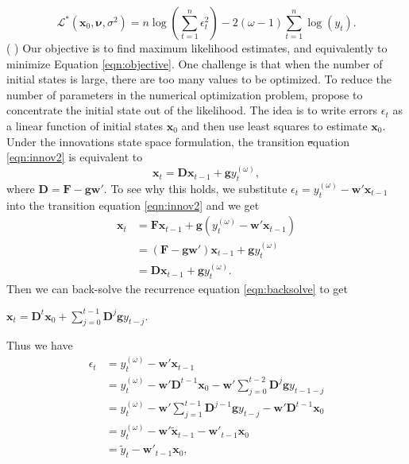 \documentclass{uwstat572}
\newcommand{\vmdel}[1]{\sout{#1}}
\newcommand{\vmadd}[1]{\textbf{\color{red}{#1}}}
\newcommand{\vmcomment}[1]{({\color{blue}{VM's comment:}} \textbf{\color{blue}{#1}})}
\begin{document}
\begin{equation}
\mathcal{L}^{*}(\textbf{x}_0, \bm{\nu},\sigma^2)=n \log (\sum\limits_{t=1}^n \epsilon_t^2)-2(\omega-1) \sum\limits_{t=1}^n \log(y_t).
\label{eqn:objective}
\end{equation}
\vmcomment{Very unclear where the parameters enter the likelihood. Please clarify this.}
Our objective is to find maximum likelihood estimates, and equivalently to minimize 
\vmadd{likelihood in} Equation \eqref{eqn:objective}. One challenge is that when the number of initial states is large, there are too many values to be optimized. To reduce the number of parameters in the numerical optimization problem, \citet{de2011forecasting} propose to concentrate the initial state out of the likelihood. The idea is to write errors $\epsilon_t$ as a linear function of initial states $\textbf{x}_0$ and then use least squares to estimate $\textbf{x}_0$. Under the innovations state space formulation, the transition \vmdel{e}\vmadd{E}quation \eqref{eqn:innov2} is equivalent to 
\begin{equation}
\textbf{x}_t=\textbf{D}\textbf{x}_{t-1}+\textbf{g}y_t^{(\omega)}, \label{eqn:backsolve}
\end{equation}
where $\textbf{D}=\textbf{F}-\textbf{g} \textbf{w}'$. To see why this holds, we substitute $\displaystyle  \epsilon_t=y_t^{(\omega)}-\textbf{w}'\textbf{x}_{t-1}$ into the transition equation \ref{eqn:innov2} and we get
\begin{align*}
\textbf{x}_t&= \textbf{F}\textbf{x}_{t-1}+\textbf{g}(y_t^{(\omega)}-\textbf{w}'\textbf{x}_{t-1}) \\
&= (\textbf{F}-\textbf{g} \textbf{w}') \textbf{x}_{t-1} +\textbf{g} y_t^{(\omega)} \\
&= \textbf{D} \textbf{x}_{t-1} +\textbf{g}y_t^{(\omega)}  .
\end{align*}
Then we can back-solve the recurrence equation \ref{eqn:backsolve} to get 
\begin{center}
$\textbf{x}_t=\textbf{D}^t \textbf{x}_0+\sum\limits_{j=0}^{t-1} \textbf{D}^j \textbf{g} y_{t-j}$.
\end{center}
Thus we have 
\begin{align*}
\epsilon_t &= y_t^{(\omega)}-\textbf{w}'\textbf{x}_{t-1} \\
&= y_t^{(\omega)}-\textbf{w}'\textbf{D}^{t-1} \textbf{x}_0-\textbf{w}' \sum\limits_{j=0}^{t-2} \textbf{D}^j \textbf{g} y_{t-1-j} \\
&=  y_t^{(\omega)}-\textbf{w}' \sum\limits_{j=1}^{t-1} \textbf{D}^{j -1}\textbf{g} y_{t-j} -\textbf{w}' \textbf{D}^{t-1} \textbf{x}_0\\
&=  y_t^{(\omega)}- \textbf{w}' \tilde{\textbf{x}}_{t-1}-\textbf{w}'_{t-1}\textbf{x}_0 \\
&= \tilde{y}_t -\textbf{w}'_{t-1}\textbf{x}_0,
\end{align*}
\end{document}
